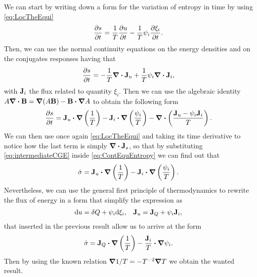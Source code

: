 {
    We can start by writing down a form for the variation of entropy in time by using \eqref{eq:LocTheEqui}
    \begin{equation}
        \pdv{s}{t} = \frac{1}{T}\pdv{u}{t} - \frac{1}{T}\psi_i\pdv{\xi_i}{t}.
    \end{equation}
    Then, we can use the normal continuity equations on the energy densities and on the conjugates responses having that
    \begin{equation}
        \pdv{s}{t} = -\frac{1}{T}\grad\vdot\vb{J}_u + \frac{1}{T}\psi_i\grad\vdot\vb{J}_i,
    \end{equation}
    with $\vb{J}_i$ the flux related to quantity $\xi_i$. Then we can use the algebraic identity $A\grad\vdot \vb{B} = \grad(A\vb{B}) - \vb{B}\vdot\grad A$ to obtain the following form
    \begin{equation}
        \label{eq:intermediateCGE}
        \pdv{s}{t} = \vb{J}_u\vdot\grad\left( \frac{1}{T} \right) - \vb{J}_i\vdot\grad\left( \frac{\psi_i}{T} \right) - \grad\vdot\left( \frac{\vb{J}_u - \psi_i\vb{J}_i}{T} \right).
    \end{equation}
    We can then use once again \eqref{eq:LocTheEqui} and taking its time derivative to notice how the last term is simply $\grad\vdot\vb{J}_s$, so that by substituting \eqref{eq:intermediateCGE} inside \eqref{eq:ContEquEntropy} we can find out that
    \begin{equation}
        \dot{\sigma} = \vb{J}_u\vdot\grad\left( \frac{1}{T} \right) - \vb{J}_i\vdot\grad\left( \frac{\psi_i}{T} \right).
    \end{equation}
    Nevertheless, we can use the general first principle of thermodynamics to rewrite the flux of energy in a form that simplify the expression as
    \begin{align}
        &\dd u = \delta Q + \psi_i \dd \xi_i, &\vb{J}_u = \vb{J}_Q + \psi_i\vb{J}_i,
    \end{align}
    that inserted in the previous result allow us to arrive at the form
    \begin{equation}
        \dot{\sigma} = \vb{J}_Q\vdot\grad\left( \frac{1}{T} \right) - \frac{\vb{J}_i}{T}\vdot\grad\psi_i.
    \end{equation}
    Then by using the known relation $\grad 1/T = -T^{-2}\grad T$ we obtain the wanted result.
}

